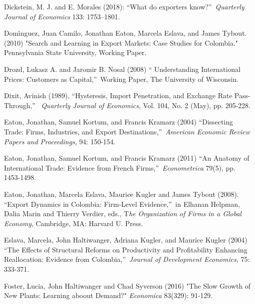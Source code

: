 \documentclass[12pt]{article}
\begin{document}
\begin{description}
\item Dickstein, M. J. and E. Morales (2018): \textquotedblleft What do
exporters know?\textquotedblright\ \textit{Quarterly Journal of Economics}
133: 1753--1801.

\item Dom\'{\i}nguez, Juan Camilo, Jonathan Eaton, Marcela Eslava, and James
Tybout. (2010) "Search and Learning in Export Markets: Case Studies for
Colombia." Pennsylvania State University, Working Paper.

\item Drozd, Lukasz A. and Jaromir B. Nosal (2008) \textquotedblleft
Understanding International Prices: Customers as Capital,\textquotedblright\
Working Paper, The University of Wisconsin.

\item Dixit, Avinish (1989), \textquotedblleft Hysteresis, Import
Penetration, and Exchange Rate Pass-Through,\textquotedblright\ \textit{%
Quarterly Journal of Economics}, Vol. 104, No. 2 (May), pp. 205-228.

\item Eaton, Jonathan, Samuel Kortum, and Francis Kramarz (2004)
\textquotedblleft Dissecting Trade: Firms, Industries, and Export
Destinations,\textquotedblright\ \textit{American Economic Review Papers and
Proceedings,} 94: 150-154.

\item Eaton, Jonathan, Samuel Kortum, and Francis Kramarz (2011)
\textquotedblleft An Anatomy of International Trade: Evidence from French
Firms,\textquotedblright\ \textit{Econometrica} 79(5), pp. 1453-1498.

\item Eaton, Jonathan, Marcela Eslava, Maurice Kugler and James Tybout
(2008). \textquotedblleft Export Dynamics in Colombia: Firm-Level
Evidence,\textquotedblright\ in Elhanan Helpman, Dalia Marin and Thierry
Verdier, eds., T\textit{he Organization of Firms in a Global Economy},
Cambridge, MA: Harvard U. Press.

\item Eslava, Marcela, John Haltiwanger, Adriana Kugler, and Maurice Kugler
(2004) \textquotedblleft The Effects of Structural Reforms on Productivity
and Profitability Enhancing Reallocation: Evidence from
Colombia,\textquotedblright\ \textit{Journal of Development Economics,} 75:
333-371.

\item Foster, Lucia, John Haltiwanger and Chad Syverson (2016) "The Slow
Growth of New Plants: Learning aboout Demand?" \textit{Economica} 83(329):
91-129.


\end{description}
\end{document}
